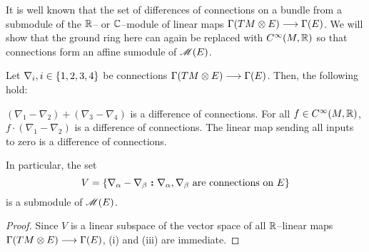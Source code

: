 \documentclass[./Thick_TQFTs_and_Quantum_Information.tex]{subfiles}
\begin{document}
It is well known that the set of differences of connections on a bundle from a
submodule of the $\mathbb{R}$-- or $\mathbb{C}$--module of linear maps
$\Gamma(TM \otimes E) \stackrel{}{\longrightarrow} \Gamma(E)$. We will show that the ground ring here
can again be replaced with $C^{\infty}(M, \mathbb{R})$ so that connections form an
affine sumodule of $\mathscr{M}(E)$.

\begin{lem}
Let $\nabla_i, i \in \set{1, 2, 3, 4}$ be connections
$\Gamma(TM \otimes E) \stackrel{}{\longrightarrow} \Gamma(E)$. Then, the following hold:
\begin{enmrt}
\li $(\nabla_1 - \nabla_2) + (\nabla_3 - \nabla_4)$ is a difference of
connections.
\li For all $f \in C^{\infty}(M, \mathbb{R})$, $f \cdot (\nabla_1 - \nabla_2)$ is a
difference of connections.
\li The linear map sending all inputs to zero is a difference of connections.
\end{enmrt}
In particular, the set
\[
  V = \set[\nabla_{\alpha} - \nabla_{\beta}]
          {\nabla_{\alpha}, \nabla_{\beta} \text{ are connections on } E}
\]
is a submodule of $\mathscr{M}(E)$.
\end{lem}
\begin{proof}
Since $V$ is a linear subspace of the vector space of all $\mathbb{R}$--linear
maps $\Gamma(TM \otimes E) \stackrel{}{\longrightarrow} \Gamma(E)$, (i) and (iii) are immediate.
\end{proof}
\end{document}
